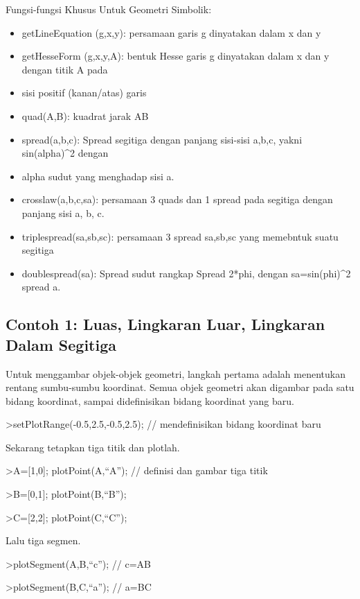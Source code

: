 \documentclass[
]{book}
\providecommand{\tightlist}{%
  \setlength{\itemsep}{0pt}\setlength{\parskip}{0pt}}
\begin{document}
Fungsi-fungsi Khusus Untuk Geometri Simbolik:

\begin{itemize}
\tightlist
\item
  getLineEquation (g,x,y): persamaan garis g dinyatakan dalam x dan y
\item
  getHesseForm (g,x,y,A): bentuk Hesse garis g dinyatakan dalam x dan y dengan titik A pada
\item
  sisi positif (kanan/atas) garis
\item
  quad(A,B): kuadrat jarak AB
\item
  spread(a,b,c): Spread segitiga dengan panjang sisi-sisi a,b,c, yakni sin(alpha)\^{}2 dengan
\item
  alpha sudut yang menghadap sisi a.
\item
  crosslaw(a,b,c,sa): persamaan 3 quads dan 1 spread pada segitiga dengan panjang sisi a, b, c.
\item
  triplespread(sa,sb,sc): persamaan 3 spread sa,sb,sc yang memebntuk suatu segitiga
\item
  doublespread(sa): Spread sudut rangkap Spread 2*phi, dengan sa=sin(phi)\^{}2 spread a.
\end{itemize}

\subsection{Contoh 1: Luas, Lingkaran Luar, Lingkaran Dalam Segitiga}\label{contoh-1-luas-lingkaran-luar-lingkaran-dalam-segitiga}

Untuk menggambar objek-objek geometri, langkah pertama adalah menentukan rentang sumbu-sumbu koordinat. Semua objek geometri akan digambar pada satu bidang koordinat, sampai didefinisikan bidang koordinat yang baru.

\textgreater setPlotRange(-0.5,2.5,-0.5,2.5); // mendefinisikan bidang koordinat baru

Sekarang tetapkan tiga titik dan plotlah.

\textgreater A={[}1,0{]}; plotPoint(A,``A''); // definisi dan gambar tiga titik

\textgreater B={[}0,1{]}; plotPoint(B,``B'');

\textgreater C={[}2,2{]}; plotPoint(C,``C'');

Lalu tiga segmen.

\textgreater plotSegment(A,B,``c''); // c=AB

\textgreater plotSegment(B,C,``a''); // a=BC
\end{document}
